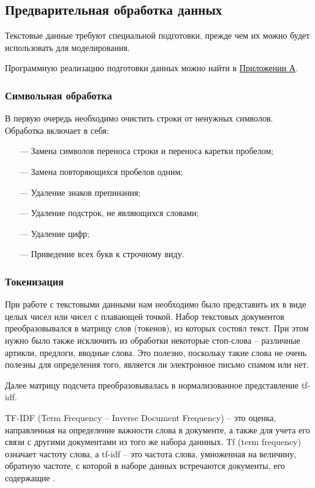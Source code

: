 \subsection{Предварительная обработка данных}

Текстовые данные требуют специальной подготовки, прежде чем их можно будет использовать для
моделирования.

Программную реализацию подготовки данных можно найти в \hyperref[App1]{Приложении А}.

\subsubsection{Символьная обработка}

В первую очередь необходимо очистить строки от ненужных символов. Обработка включает в себя:

\begin{itemize}
    \item[—] Замена символов переноса строки и переноса каретки пробелом;
    \item[—] Замена повторяющихся пробелов одним;
    \item[—] Удаление знаков препинания;
    \item[—] Удаление подстрок, не являющихся словами;
    \item[—] Удаление цифр;
    \item[—] Приведение всех букв к строчному виду.
\end{itemize}

\subsubsection{Токенизация}

При работе с текстовыми данными нам необходимо было представить их в виде целых чисел или чисел с плавающей точкой.
Набор текстовых документов преобразовывался в матрицу слов (токенов), из которых состоял текст. При этом нужно было также
исключить из обработки некоторые стоп-слова -- различные артикли, предлоги, вводные слова. Это полезно,
поскольку такие слова не очень полезны для определения того, является ли электронное письмо спамом или нет.

Далее матрицу подсчета преобразовывалась в нормализованное представление tf-idf.

TF-IDF (Term Frequency -- Inverse Document Frequency) -- это оценка, направленная на определение важности слова
в документе, а также для учета его связи с другими документами из того же набора даннных. Tf (term frequency)
означает частоту слова, а tf-idf -- это частота слова, умноженная на величину, обратную частоте,
с которой в наборе данных встречаются документы, его содержащие \cite{Manning}.

